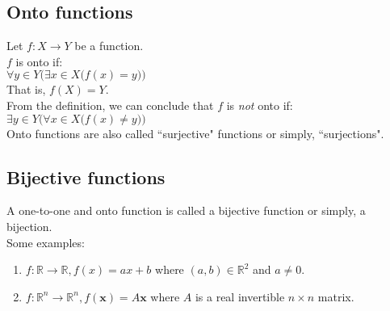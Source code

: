 \hrulefill
{}

\hrulefill
\subsection{Onto functions}
Let $f:X\to Y$ be a function.\\
$f$ is onto if:\\
$\forall y \in Y \Big(\exists x \in X \big(f(x) =y\big)\Big)$\\
That is, $f(X) = Y$.\\
From the definition, we can conclude that $f$ is \textit{not} onto if:\\
$\exists y \in Y\Big(\forall x \in X\big(f(x)\neq y\big)\Big)$\\
Onto functions are also called ``surjective" functions or simply, ``surjections".

\hrulefill
{}

\hrulefill
\subsection{Bijective functions}
A one-to-one and onto function is called a bijective function or simply, a bijection.\\
Some examples:
\begin{enumerate}[nosep]
    \item $f:\mathbb{R}\to\mathbb{R}, f(x)=ax+b$ where $(a, b)\in\mathbb{R}^2$ and $a\neq0$.
    \item $f:\mathbb{R}^n\to\mathbb{R}^n, f(\textbf{x}) = A\textbf{x}$ where $A$ is a real invertible $n\times n$ matrix.
\end{enumerate}
